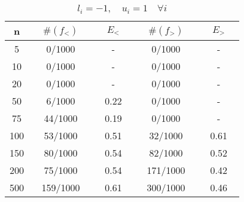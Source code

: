 \begin{table}
\begin{center}
\begin{tabular}{ c | c | c | c | c}

n &  $\quad \#(f_<) \quad$ & $\quad E_< \quad$ &  $\quad \#(f_>) \quad$ & $ \quad E_> \quad$  \\\hline
5  & 0/1000    & - &    0/1000 & -  \\\hline
10 & 0/1000   & - &    0/1000 & -   \\\hline
20 & 0/1000   & - &    0/1000 & -     \\\hline
50 & 6/1000   & 0.22 &     0/1000 & -     \\\hline
75 & 44/1000   & 0.19 &     0/1000 & -     \\\hline
100 & 53/1000   & 0.51 &     32/1000 & 0.61   \\\hline
150 & 80/1000   & 0.54 &     82/1000 & 0.52    \\\hline
200 & 75/1000   & 0.54 &     171/1000 & 0.42    \\\hline
500 & 159/1000   & 0.61 &     300/1000 & 0.46   \\\hline
\end{tabular}
\caption{$l_i = -1, \quad u_i = 1 \quad \forall i$}
\label{tab:results4}
\end{center}
\end{table}
